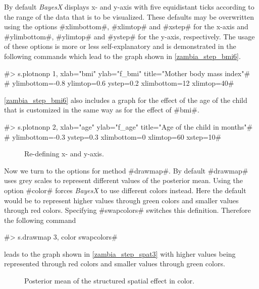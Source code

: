 \documentclass[11pt,a4paper,twoside]{bayesxreport}
\begin{document}
By default {\it BayesX} displays x- and y-axis with five equidistant
ticks according to the range of the data that is to be visualized.
These defaults may be overwritten using the options #xlimbottom#,
#xlimtop# and #xstep# for the x-axis and #ylimbottom#, #ylimtop# and
#ystep# for the y-axis, respectively. The usage of these options is
more or less self-explanatory and is demonstrated in the following
commands which lead to the graph shown in
\autoref{zambia_step_bmi6}.

#> s.plotnonp 1, xlab="bmi" ylab="f_bmi" title="Mother body mass index"#\\
#  ylimbottom=-0.8 ylimtop=0.6 ystep=0.2 xlimbottom=12 xlimtop=40#

\autoref{zambia_step_bmi6} also includes a graph for the effect of
the age of the child that is customized in the same way as for the
effect of #bmi#.

#> s.plotnonp 2, xlab="age" ylab="f_age" title="Age of the child in months"#\\
#  ylimbottom=-0.3  ystep=0.3 xlimbottom=0 xlimtop=60 xstep=10#

\begin{figure}[ht]
\begin{center}
{\it\caption{Re-defining x- and y-axis.\label{zambia_step_bmi6}}}
\end{center}
\end{figure}

Now we turn to the options for method #drawmap#. By default
#drawmap# uses grey scales to represent different values of the
posterior mean. Using the option #color# forces {\it BayesX} to use
different colors instead. Here the default would be to represent
higher values through green colors and smaller values through red
colors. Specifying #swapcolors# switches this definition. Therefore
the following command

#> s.drawmap 3, color swapcolors#

leads to the graph shown in \autoref{zambia_step_spat3} with higher
values being represented through red colors and smaller values
through green colors.

\begin{figure}[ht]
\begin{center}
{\it\caption{Posterior mean of the structured spatial effect in
color.\label{zambia_step_spat3}}}
\end{center}
\end{figure}
\end{document}
